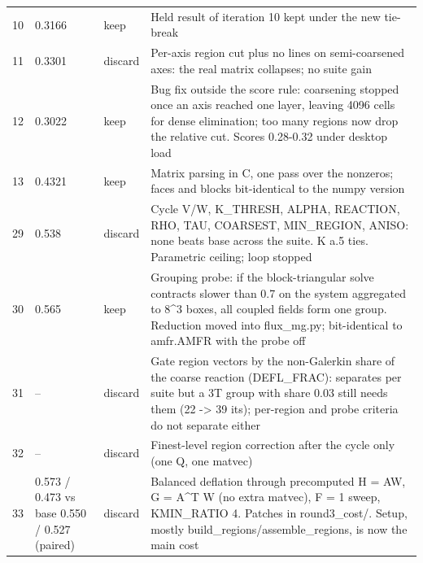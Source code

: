 {\begin{longtable}{rlll}
10 & 0.3166 & keep & \parbox[t]{9.2cm}{\raggedright Held result of iteration 10 kept under the new tie-break} \\
11 & 0.3301 & discard & \parbox[t]{9.2cm}{\raggedright Per-axis region cut plus no lines on semi-coarsened axes: the real matrix collapses; no suite gain} \\
12 & 0.3022 & keep & \parbox[t]{9.2cm}{\raggedright Bug fix outside the score rule: coarsening stopped once an axis reached one layer, leaving 4096 cells for dense elimination; too many regions now drop the relative cut. Scores 0.28-0.32 under desktop load} \\
13 & 0.4321 & keep & \parbox[t]{9.2cm}{\raggedright Matrix parsing in C, one pass over the nonzeros; faces and blocks bit-identical to the numpy version} \\
29 & 0.538 & discard & \parbox[t]{9.2cm}{\raggedright Cycle V/W, K\_THRESH, ALPHA, REACTION, RHO, TAU, COARSEST, MIN\_REGION, ANISO: none beats base across the suite. K a.5 ties. Parametric ceiling; loop stopped} \\
30 & 0.565 & keep & \parbox[t]{9.2cm}{\raggedright Grouping probe: if the block-triangular solve contracts slower than 0.7 on the system aggregated to 8\^{}3 boxes, all coupled fields form one group. Reduction moved into flux\_mg.py; bit-identical to amfr.AMFR with the probe off} \\
31 & -- & discard & \parbox[t]{9.2cm}{\raggedright Gate region vectors by the non-Galerkin share of the coarse reaction (DEFL\_FRAC): separates per suite but a 3T group with share 0.03 still needs them (22 -\textgreater{} 39 its); per-region and probe criteria do not separate either} \\
32 & -- & discard & \parbox[t]{9.2cm}{\raggedright Finest-level region correction after the cycle only (one Q, one matvec)} \\
33 & 0.573 / 0.473 vs base 0.550 / 0.527 (paired) & discard & \parbox[t]{9.2cm}{\raggedright Balanced deflation through precomputed H = AW, G = A\^{}T W (no extra matvec), F = 1 sweep, KMIN\_RATIO 4. Patches in round3\_cost/. Setup, mostly build\_regions/assemble\_regions, is now the main cost} \\
\end{longtable}}
\FloatBarrier
